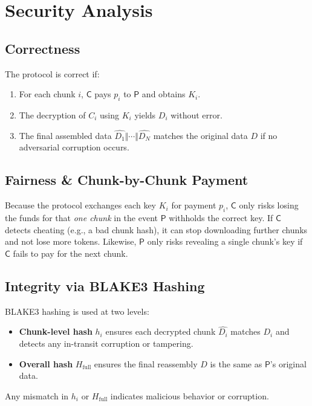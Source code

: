 \documentclass[11pt]{article}
\begin{document}
\section{Security Analysis}
\subsection{Correctness}
The protocol is correct if:
\begin{enumerate}
    \item For each chunk $i$, $\mathsf{C}$ pays $p_i$ to $\mathsf{P}$ and obtains $K_i$.
    \item The decryption of $C_i$ using $K_i$ yields $D_i$ without error.
    \item The final assembled data $\widehat{D_1}\Vert \cdots \Vert \widehat{D_N}$ matches the original data $D$ if no adversarial corruption occurs.
\end{enumerate}

\subsection{Fairness \& Chunk-by-Chunk Payment}
Because the protocol exchanges each key $K_i$ for payment $p_i$, $\mathsf{C}$ only risks losing the funds for that \emph{one chunk} in the event $\mathsf{P}$ withholds the correct key. 
If $\mathsf{C}$ detects cheating (e.g., a bad chunk hash), it can stop downloading further chunks and not lose more tokens. 
Likewise, $\mathsf{P}$ only risks revealing a single chunk’s key if $\mathsf{C}$ fails to pay for the next chunk.

\subsection{Integrity via BLAKE3 Hashing}
BLAKE3 hashing is used at two levels:
\begin{itemize}
    \item \textbf{Chunk-level hash} $h_i$ ensures each decrypted chunk $\widehat{D_i}$ matches $D_i$ and detects any in-transit corruption or tampering.
    \item \textbf{Overall hash} $H_{\mathrm{full}}$ ensures the final reassembly $\widehat{D}$ is the same as $\mathsf{P}$’s original data.
\end{itemize}
Any mismatch in $h_i$ or $H_{\mathrm{full}}$ indicates malicious behavior or corruption.
\end{document}
